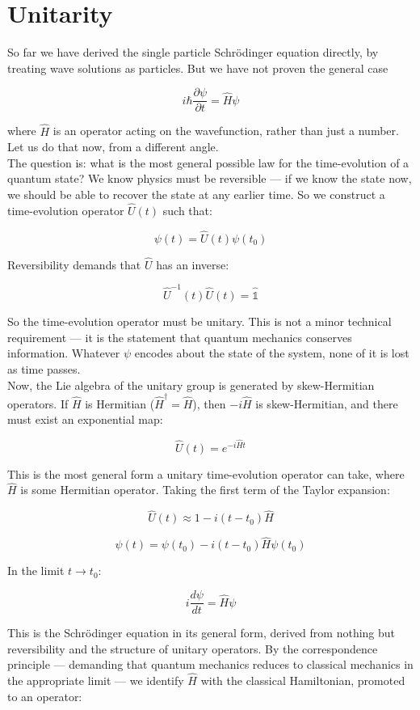 \documentclass[krantz1,ChapterTOCs]{krantz}
\begin{document}
\section*{Unitarity}

So far we have derived the single particle Schr\"{o}dinger equation 
directly, by treating wave solutions as particles. But we have not 
proven the general case

$$i\hbar\frac{\partial\psi}{\partial t} = \hat{H}\psi$$

where $\hat{H}$ is an operator acting on the wavefunction, rather 
than just a number. Let us do that now, from a different angle.\\

The question is: what is the most general possible law for the 
time-evolution of a quantum state? We know physics must be 
reversible --- if we know the state now, we should be able to 
recover the state at any earlier time. So we construct a 
time-evolution operator $\hat{U}(t)$ such that:

$$\psi(t) = \hat{U}(t)\psi(t_0)$$

Reversibility demands that $\hat{U}$ has an inverse:

$$\hat{U}^{-1}(t)\hat{U}(t) = \hat{\mathbb{1}}$$

So the time-evolution operator must be unitary. This is not a 
minor technical requirement --- it is the statement that quantum 
mechanics conserves information. Whatever $\psi$ encodes about the 
state of the system, none of it is lost as time passes.\\

Now, the Lie algebra of the unitary group is generated by 
skew-Hermitian operators. If $\hat{H}$ is Hermitian 
($\hat{H}^\dagger = \hat{H}$), then $-i\hat{H}$ is 
skew-Hermitian, and there must exist an exponential map:

$$\hat{U}(t) = e^{-i\hat{H}t}$$

This is the most general form a unitary time-evolution operator 
can take, where $\hat{H}$ is some Hermitian operator. Taking the 
first term of the Taylor expansion:

$$\hat{U}(t) \approx 1 - i(t - t_0)\hat{H}$$

$$\psi(t) = \psi(t_0) - i(t - t_0)\hat{H}\psi(t_0)$$

In the limit $t \to t_0$:

$$\boxed{i\frac{d\psi}{dt} = \hat{H}\psi}$$

This is the Schr\"{o}dinger equation in its general form, derived 
from nothing but reversibility and the structure of unitary 
operators. By the correspondence principle --- demanding that 
quantum mechanics reduces to classical mechanics in the appropriate 
limit --- we identify $\hat{H}$ with the classical Hamiltonian, 
promoted to an operator:
\end{document}
